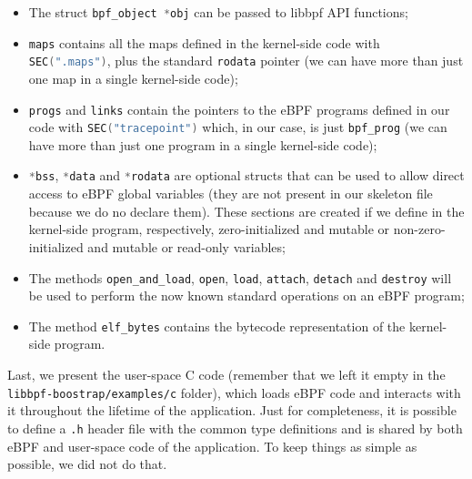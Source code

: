\begin{itemize}
	\item 
		The struct \colorbox{backcolour}{\lstinline[style=cstyle, language=C]|bpf_object *obj|} can be passed to libbpf API functions;
	\item 
		\colorbox{backcolour}{\lstinline[style=cstyle, language=C]|maps|} contains all the maps defined in the kernel-side code with \colorbox{backcolour}{\lstinline[style=cstyle, language=C]|SEC(".maps")|}, plus the standard \colorbox{backcolour}{\lstinline[style=cstyle, language=C]|rodata|} pointer (we can have more than just one map in a single kernel-side code);
	\item 
		\colorbox{backcolour}{\lstinline[style=cstyle, language=C]|progs|} and \colorbox{backcolour}{\lstinline[style=cstyle, language=C]|links|} contain the pointers to the eBPF programs defined in our code with \colorbox{backcolour}{\lstinline[style=cstyle, language=C]|SEC("tracepoint")|} which, in our case, is just \colorbox{backcolour}{\lstinline[style=cstyle, language=C]|bpf_prog|} (we can have more than just one program in a single kernel-side code);
	\item 
		\colorbox{backcolour}{\lstinline[style=cstyle, language=C]|*bss|}, \colorbox{backcolour}{\lstinline[style=cstyle, language=C]|*data|} and \colorbox{backcolour}{\lstinline[style=cstyle, language=C]|*rodata|} are optional structs that can be used to allow direct access to eBPF global variables (they are not present in our skeleton file because we do no declare them).
		These sections are created if we define in the kernel-side program, respectively, zero-initialized and mutable or non-zero-initialized and mutable or read-only variables;
	\item 
		The methods \colorbox{backcolour}{\lstinline[style=cstyle, language=C]|open_and_load|}, \colorbox{backcolour}{\lstinline[style=cstyle, language=C]|open|}, \colorbox{backcolour}{\lstinline[style=cstyle, language=C]|load|}, \colorbox{backcolour}{\lstinline[style=cstyle, language=C]|attach|}, \colorbox{backcolour}{\lstinline[style=cstyle, language=C]|detach|} and \colorbox{backcolour}{\lstinline[style=cstyle, language=C]|destroy|} will be used to perform the now known standard operations on an eBPF program;
	\item 
		The method \colorbox{backcolour}{\lstinline[style=cstyle, language=C]|elf_bytes|} contains the bytecode representation of the kernel-side program.
\end{itemize}

Last, we present the user-space C code (remember that we left it empty in the \colorbox{backcolour}{\lstinline[style=highlight, language=bash]|libbpf-boostrap/examples/c|} folder), which loads eBPF code and interacts with it throughout the lifetime of the application.
Just for completeness, it is possible to define a \colorbox{backcolour}{\lstinline[style=highlight, language=bash]|.h|} header file with the common type definitions and is shared by both eBPF and user-space code of the application.
To keep things as simple as possible, we did not do that.

